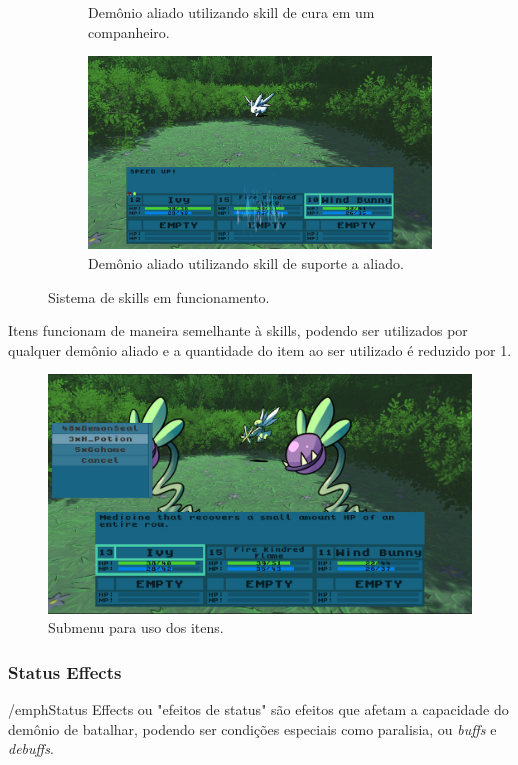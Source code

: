\documentclass[
	12pt,				%
	openright,			%
	twoside,			%
	a4paper,			%
	english,			%
	french,				%
	spanish,			%
	brazil				%
	]{abntex2}
\begin{document}
\begin{figure}[h!]
\begin{subfigure}[b]{0.49\linewidth}
    \caption{Demônio aliado utilizando skill de cura em um companheiro.}
  \end{subfigure}
  \begin{subfigure}[b]{0.49\linewidth}
    \includegraphics[width=\linewidth]{support.jpg}
    \caption{Demônio aliado utilizando skill de suporte a aliado.}
  \end{subfigure}
  \caption{Sistema de skills em funcionamento.}
  \label{fig:battle2}
\end{figure}

Itens funcionam de maneira semelhante à skills, podendo ser utilizados por qualquer demônio aliado e a quantidade do item ao ser utilizado é reduzido por 1.

\begin{figure}[h!]
 \centering
  \includegraphics[width=0.5\linewidth]{itemmenu.jpg}
  \caption{Submenu para uso dos itens.}
  \label{fig:itens}
\end{figure}

\subsubsection{Status Effects}

/emph{Status Effects} ou "efeitos de status" são efeitos que afetam a capacidade do demônio de batalhar, podendo ser condições especiais como paralisia, ou \emph{buffs} e \emph{debuffs}.
\end{document}
